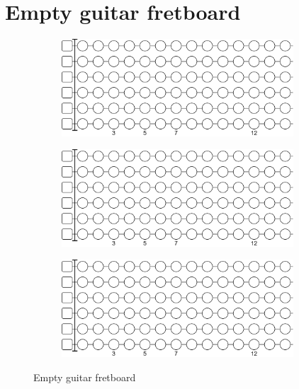\chapter{Empty guitar fretboard} \label{chap:empty_guitar_fretboard}

\begin{figure}[h]
	\begin{subfigure}[b]{\textwidth}
		\centering
		\includegraphics[width=0.95\textwidth]{../../Images/guitar_empty_fretboard.png}
	\end{subfigure}
	
	\vspace{0.5cm}
	
	\begin{subfigure}[b]{\textwidth}
		\centering
		\includegraphics[width=0.95\textwidth]{../../Images/guitar_empty_fretboard.png}
	\end{subfigure}
	
	\vspace{0.5cm}

	\begin{subfigure}[b]{\textwidth}
		\centering
		\includegraphics[width=0.95\textwidth]{../../Images/guitar_empty_fretboard.png}
	\end{subfigure}
	
	\caption{Empty guitar fretboard}
	\label{fig:guitar_empty_fretboard}
\end{figure}